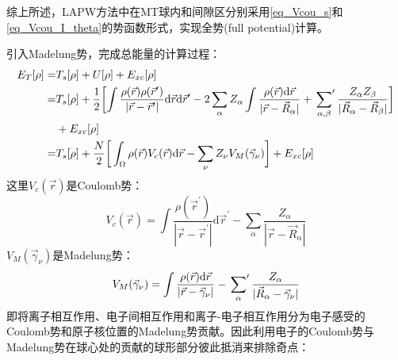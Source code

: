 综上所述，\textrm{LAPW}方法中在\textrm{MT}球内和间隙区分别采用\eqref{eq_Vcou_s}和\eqref{eq_Vcou_I_theta}的势函数形式，实现全势(\textrm{full potential})\cite{PRB26-4571_1982,PRB33-823_1986}计算。

引入\textrm{Madelung}势，完成总能量的计算过程\cite{JMP22-2433_1981}：
\begin{equation}
	\begin{aligned}
	E_T[\rho]=&T_s[\rho]+U[\rho]+E_{xc}[\rho]\\
	=&T_s[\rho]+\dfrac12\biggl[\int\dfrac{\rho(\vec r)\rho(\vec r^{\prime}){}}{|\vec r-\vec r^{\prime}|}\mathrm{d}\vec r\mathrm{d}\vec r^{\prime}-2\sum_{\alpha}Z_{\alpha}\int\dfrac{\rho(\vec r)\mathrm{d}\vec r}{|\vec r-\vec R_{\alpha}|}+\sideset{}{^\prime}\sum_{\alpha,\beta}\dfrac{Z_{\alpha}Z_{\beta}}{|\vec R_{\alpha}-\vec R_{\beta}|}\biggr]\\
	&+E_{xc}[\rho]\\
	=&T_s[\rho]+\dfrac{N}2\bigg[\int_{\Omega}\rho(\vec r)V_c(\vec r)\mathrm{d}\vec r-\sum_{\nu}Z_{\nu}V_M(\vec\gamma_{\nu})\biggr]+E_{xc}[\rho]
	\end{aligned}
	\label{eq_E_total}
\end{equation}
这里$V_c(\vec r)$是\textrm{Coulomb}势：
\begin{equation}
	V_c(\vec r)=\int\dfrac{\rho(\vec r^{\prime})}{|\vec r-\vec r^{\prime}|}\mathrm{d}\vec r^{\prime}-\sum_{\alpha}\dfrac{Z_{\alpha}}{|\vec r-\vec R_{\alpha}|}
	\label{eq_Vcou_WIEN}
\end{equation}
$V_M(\vec\gamma_{\nu})$是\textrm{Madelung}势：
\begin{equation}
	V_M(\vec\gamma_{\nu})=\int\dfrac{\rho(\vec r)\mathrm{d}\vec r}{|\vec r-\vec\gamma_{\nu}|}-\sideset{}{^\prime}\sum_{\alpha}\dfrac{Z_{\alpha}}{|\vec R_{\alpha}-\vec\gamma_{\nu}|}
	\label{eq_Vmadelung}
\end{equation}
即将离子相互作用、电子间相互作用和离子-电子相互作用分为电子感受的\textrm{Coulomb}势和原子核位置的\textrm{Madelung}势贡献。因此利用电子的\textrm{Coulomb}势与\textrm{Madelung}势在球心处的贡献的球形部分彼此抵消来排除奇点：

